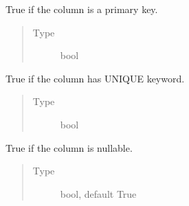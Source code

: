 \documentclass[letterpaper,10pt,english]{sphinxmanual}
\begin{document}
\begin{fulllineitems}
\begin{fulllineitems}
\begin{quote}
\begin{description}
\end{description}\end{quote}

\end{fulllineitems}


\begin{fulllineitems}
\label{\detokenize{model:simple_sql.model.column.Column.__primary_key}}
\sphinxAtStartPar
True if the column is a primary key.
\begin{quote}\begin{description}
\item[{Type}] \leavevmode
\sphinxAtStartPar
bool

\end{description}\end{quote}

\end{fulllineitems}


\begin{fulllineitems}
\label{\detokenize{model:simple_sql.model.column.Column.__unique}}
\sphinxAtStartPar
True if the column has UNIQUE keyword.
\begin{quote}\begin{description}
\item[{Type}] \leavevmode
\sphinxAtStartPar
bool

\end{description}\end{quote}

\end{fulllineitems}


\begin{fulllineitems}
\label{\detokenize{model:simple_sql.model.column.Column.__nullable}}
\sphinxAtStartPar
True if the column is nullable.
\begin{quote}\begin{description}
\item[{Type}] \leavevmode
\sphinxAtStartPar
bool, default True


\end{description}
\end{quote}
\end{fulllineitems}
\end{fulllineitems}
\end{document}
